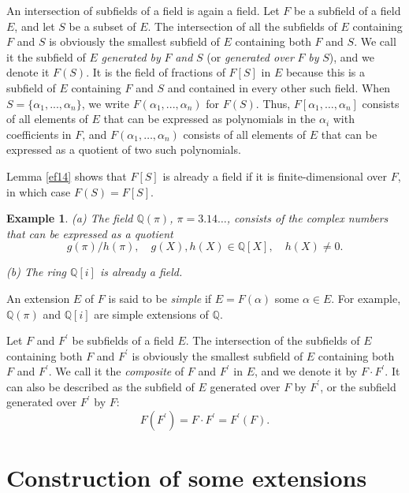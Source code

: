 \documentclass[a4paper,11pt,final,openany]{memoir}
\newtheorem{example}[X]{Example}
\theoremstyle{nonumberplain}
\begin{document}
%


An intersection of subfields of a field is again a field. Let $F$ be a
subfield of a field $E$, and let $S$ be a subset of $E$. The intersection of
all the subfields of $E$ containing $F$ and $S$ is obviously the smallest
subfield of $E$ containing both $F$ and $S$. We call it the subfield of $E$
\emph{generated by} $F$ \emph{and} $S$ (or \emph{generated over} $F$ \emph{by}
$S$), and we denote it $F(S)$. It is the field of fractions of $F[S]$ in $E$
because this is a subfield of $E$ containing $F$ and $S$ and contained in
every other such field. When $S=\{\alpha_{1},...,\alpha_{n}\}$, we write
$F(\alpha_{1},...,\alpha_{n})$ for $F(S)$. Thus, $F[\alpha_{1},\ldots
,\alpha_{n}]$ consists of all elements of $E$ that can be expressed as
polynomials in the $\alpha_{i}$ with coefficients in $F$, and $F(\alpha
_{1},\ldots,\alpha_{n})$ consists of all elements of $E$ that can be expressed
as a quotient of two such polynomials.

Lemma \ref{ef14} shows that $F[S]$ is already a field if it is
finite-dimensional over $F$, in which case $F(S)=F[S]$.

\begin{example}
\label{ef16}(a) The field $\mathbb{Q}(\pi)$, $\pi=3.14\ldots$, consists of the
complex numbers that can be expressed as a quotient
\[
g(\pi)/h(\pi),\quad g(X),h(X)\in\mathbb{Q}[X],\quad h(X)\neq0.
\]


(b) The ring $\mathbb{Q}[i]$ is already a field.
\end{example}

An extension $E$ of $F$ is said to be \emph{simple\/}%
if $E=F(\alpha)$ some $\alpha\in E$. For example, $\mathbb{Q}(\pi)$ and
$\mathbb{Q}[i]$ are simple extensions of $\mathbb{Q}.$

Let $F$ and $F^{\prime}$ be subfields of a field $E$. The intersection of the
subfields of $E$ containing both $F$ and $F^{\prime}$ is obviously the
smallest subfield of $E$ containing both $F$ and $F^{\prime}$. We call it the
\emph{composite }%
%
of $F$ and $F^{\prime}$ in $E$, and we denote it by $F\cdot F^{\prime}$. It
can also be described as the subfield of $E$ generated over $F$ by $F^{\prime
}$, or the subfield generated over $F^{\prime}$ by $F$:%
\[
F(F^{\prime})=F\cdot F^{\prime}=F^{\prime}(F)\text{.}%
\]


\section{Construction of some extensions}
\end{document}

